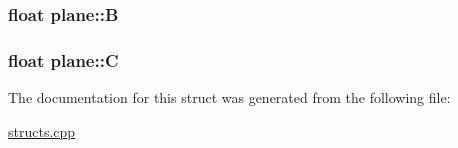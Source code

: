 \subsubsection[{\texorpdfstring{B}{B}}]{\setlength{\rightskip}{0pt plus 5cm}float plane\+::B}\hypertarget{structplane_a03abeea8dacf60d86309aa336269906f}{}\label{structplane_a03abeea8dacf60d86309aa336269906f}
\subsubsection[{\texorpdfstring{C}{C}}]{\setlength{\rightskip}{0pt plus 5cm}float plane\+::C}\hypertarget{structplane_a88b564304a3acb0f68186e2ea71a0cdc}{}\label{structplane_a88b564304a3acb0f68186e2ea71a0cdc}


The documentation for this struct was generated from the following file\+:\begin{DoxyCompactItemize}
\item 
\hyperlink{structs_8cpp}{structs.\+cpp}\end{DoxyCompactItemize}
